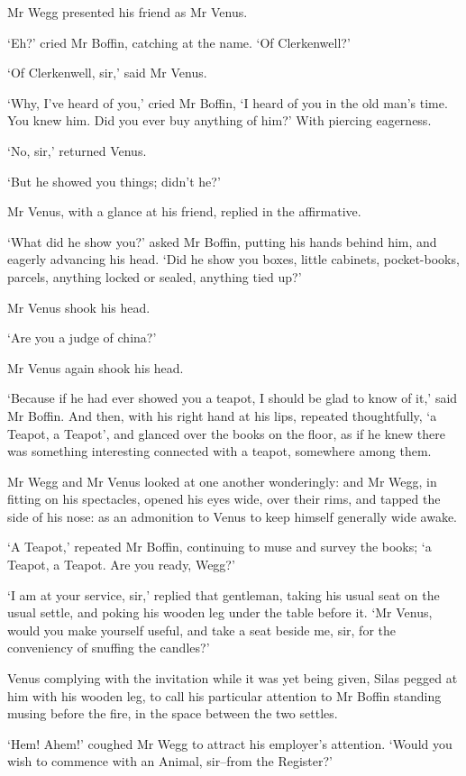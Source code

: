 Mr Wegg presented his friend as Mr Venus.

‘Eh?’ cried Mr Boffin, catching at the name. ‘Of Clerkenwell?’

‘Of Clerkenwell, sir,’ said Mr Venus.

‘Why, I’ve heard of you,’ cried Mr Boffin, ‘I heard of you in the
old man’s time. You knew him. Did you ever buy anything of him?’ With
piercing eagerness.

‘No, sir,’ returned Venus.

‘But he showed you things; didn’t he?’

Mr Venus, with a glance at his friend, replied in the affirmative.

‘What did he show you?’ asked Mr Boffin, putting his hands behind him,
and eagerly advancing his head. ‘Did he show you boxes, little cabinets,
pocket-books, parcels, anything locked or sealed, anything tied up?’

Mr Venus shook his head.

‘Are you a judge of china?’

Mr Venus again shook his head.

‘Because if he had ever showed you a teapot, I should be glad to know of
it,’ said Mr Boffin. And then, with his right hand at his lips, repeated
thoughtfully, ‘a Teapot, a Teapot’, and glanced over the books on the
floor, as if he knew there was something interesting connected with a
teapot, somewhere among them.

Mr Wegg and Mr Venus looked at one another wonderingly: and Mr Wegg, in
fitting on his spectacles, opened his eyes wide, over their rims, and
tapped the side of his nose: as an admonition to Venus to keep himself
generally wide awake.

‘A Teapot,’ repeated Mr Boffin, continuing to muse and survey the books;
‘a Teapot, a Teapot. Are you ready, Wegg?’

‘I am at your service, sir,’ replied that gentleman, taking his usual
seat on the usual settle, and poking his wooden leg under the table
before it. ‘Mr Venus, would you make yourself useful, and take a seat
beside me, sir, for the conveniency of snuffing the candles?’

Venus complying with the invitation while it was yet being given, Silas
pegged at him with his wooden leg, to call his particular attention to
Mr Boffin standing musing before the fire, in the space between the two
settles.

‘Hem! Ahem!’ coughed Mr Wegg to attract his employer’s attention. ‘Would
you wish to commence with an Animal, sir--from the Register?’

